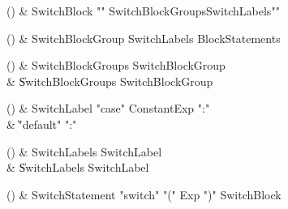 \begin{bbgrammarappendix}

() & SwitchBlock \label{prod:SwitchBlock}  \: \xcd"{" SwitchBlockGroups\opt SwitchLabels\opt \xcd"}"  \\


\end{bbgrammarappendix}

\begin{bbgrammarappendix}

() & SwitchBlockGroup \label{prod:SwitchBlockGroup}  \: SwitchLabels BlockStatements  \\


\end{bbgrammarappendix}

\begin{bbgrammarappendix}

() & SwitchBlockGroups \label{prod:SwitchBlockGroups}  \: SwitchBlockGroup  \\

 &    \| SwitchBlockGroups SwitchBlockGroup \\

\end{bbgrammarappendix}

\begin{bbgrammarappendix}

() & SwitchLabel \label{prod:SwitchLabel}  \: \xcd"case" ConstantExp \xcd":"  \\

 &    \| \xcd"default" \xcd":" \\

\end{bbgrammarappendix}

\begin{bbgrammarappendix}

() & SwitchLabels \label{prod:SwitchLabels}  \: SwitchLabel  \\

 &    \| SwitchLabels SwitchLabel \\

\end{bbgrammarappendix}

\begin{bbgrammarappendix}

() & SwitchStatement \label{prod:SwitchStatement}  \: \xcd"switch" \xcd"(" Exp \xcd")" SwitchBlock  \\


\end{bbgrammarappendix}

